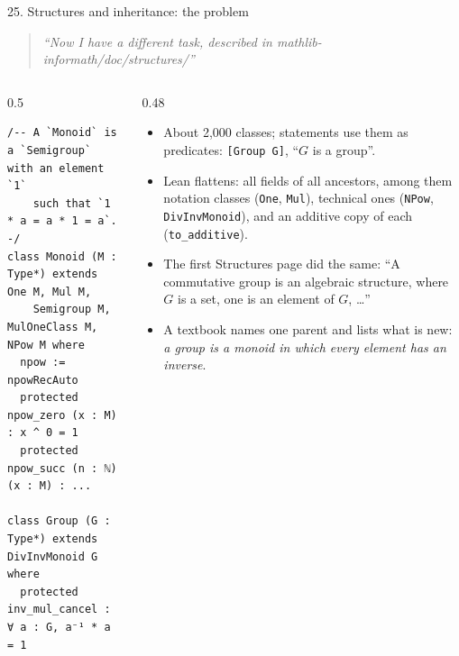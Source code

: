 \documentclass[10pt,aspectratio=169]{beamer}
\newcommand{\bad}[1]{\textcolor{warn}{#1}}
\newcommand{\ok}[1]{\textcolor{good}{#1}}
\newcommand{\prompt}[1]{\begin{quote}\small\itshape ``#1''\end{quote}}
\begin{document}
\begin{frame}[fragile]{25. Structures and inheritance: the problem}
  \footnotesize
  \prompt{Now I have a different task, described in mathlib-informath/doc/structures/}
  \begin{columns}[T]
    \begin{column}{0.5\textwidth}
\begin{lstlisting}
/-- A `Monoid` is a `Semigroup` with an element `1`
    such that `1 * a = a * 1 = a`. -/
class Monoid (M : Type*) extends One M, Mul M,
    Semigroup M, MulOneClass M, NPow M where
  npow := npowRecAuto
  protected npow_zero (x : M) : x ^ 0 = 1
  protected npow_succ (n : ℕ) (x : M) : ...

class Group (G : Type*) extends DivInvMonoid G where
  protected inv_mul_cancel : ∀ a : G, a⁻¹ * a = 1
\end{lstlisting}
    \end{column}
    \begin{column}{0.48\textwidth}
      \begin{itemize}
        \item About 2,000 classes; statements use them as predicates: \texttt{[Group G]},
              ``$G$ is a group''.
        \item Lean \bad{flattens}: all fields of all ancestors, among them notation classes
              (\texttt{One}, \texttt{Mul}), technical ones (\texttt{NPow},
              \texttt{DivInvMonoid}), and an additive copy of each (\texttt{to\_additive}).
        \item The first Structures page did the same: \bad{``A commutative group is an
              algebraic structure, where $G$ is a set, one is an element of $G$, \ldots''}
        \item A textbook names \ok{one parent} and lists what is new: \emph{a group is a
              monoid in which every element has an inverse}.
      \end{itemize}
    \end{column}
  \end{columns}
\end{frame}
\end{document}
